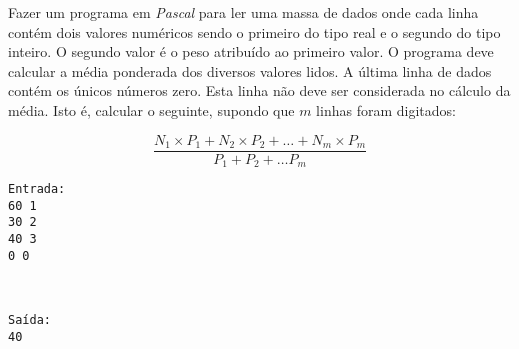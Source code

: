 \item Fazer um programa em \emph{Pascal} para
    ler  uma massa de dados onde  cada linha contém dois  valores numéricos
    sendo o primeiro do tipo real e o segundo do tipo inteiro. O segundo
    valor é o peso atribuído ao primeiro valor. O
    programa deve calcular a média ponderada dos diversos valores lidos.
    A última
    linha de  dados contém os  únicos números zero.  Esta linha não  deve ser
    considerada no cálculo da média. Isto é, calcular o seguinte, supondo
    que $m$ linhas foram digitados:

\[
\frac{N_1 \times P_1 + N_2 \times P_2 + \ldots + N_m \times P_m}{P_1 + 
 P_2 + \ldots P_m}
\]
\begin{minipage}{5cm}
\begin{verbatim}
Entrada:
60 1
30 2
40 3
0 0
\end{verbatim}
\end{minipage} \
\begin{minipage}{5cm}
\begin{verbatim}
Saída:
40
\end{verbatim}
\end{minipage}
